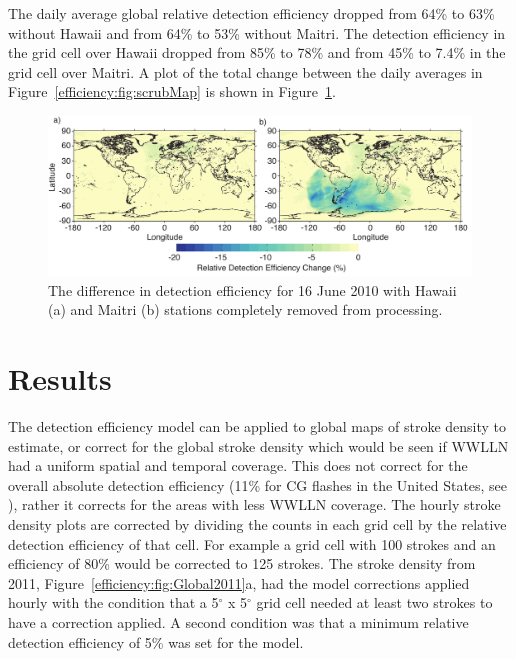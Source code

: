 The daily average global relative detection efficiency dropped from 64\% to 63\% without Hawaii and from 64\% to 53\% without Maitri.
The detection efficiency in the grid cell over Hawaii dropped from 85\% to 78\% and from 45\% to 7.4\% in the grid cell over Maitri.
A plot of the total change between the daily averages in Figure~\ref{efficiency:fig:scrubMap} is shown in Figure~\ref{efficiency:fig:scrub}.

\begin{figure}[ht!]
   \centering
\noindent\includegraphics[scale=0.8]{efficiency/Figures/2012RS005049-p13.pdf}
\caption{The difference in detection efficiency for 16 June 2010 with Hawaii (a) and Maitri (b) stations completely removed from processing.}
\label{efficiency:fig:scrub}
\end{figure}

\section{Results}

The detection efficiency model can be applied to global maps of stroke density to estimate, or correct for the global stroke density which would be seen if WWLLN had a uniform spatial and temporal coverage.
This does not correct for the overall absolute detection efficiency (11\% for CG flashes in the United States, see \citet{Abarca2010}), rather it corrects for the areas with less WWLLN coverage.
The hourly stroke density plots are corrected by dividing the counts in each grid cell by the relative detection efficiency of that cell.
For example a grid cell with 100 strokes and an efficiency of 80\% would be corrected to 125 strokes.
The stroke density from 2011, Figure~\ref{efficiency:fig:Global2011}a, had the model corrections applied hourly with the condition that a 5$^\circ$ x 5$^\circ$ grid cell needed at least two strokes to have a correction applied.
A second condition was that a minimum relative detection efficiency of 5\% was set for the model.

